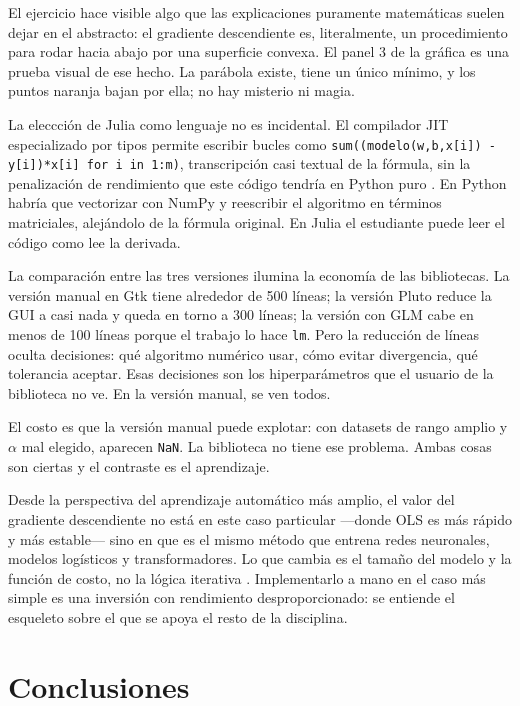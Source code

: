 \documentclass[11pt,a4paper]{article}
\begin{document}
El ejercicio hace visible algo que las explicaciones puramente matem\'aticas suelen dejar en el abstracto: el gradiente descendiente es, literalmente, un procedimiento para rodar hacia abajo por una superficie convexa. El panel 3 de la gr\'afica es una prueba visual de ese hecho. La par\'abola existe, tiene un \'unico m\'inimo, y los puntos naranja bajan por ella; no hay misterio ni magia.

La eleccci\'on de Julia como lenguaje no es incidental. El compilador JIT especializado por tipos permite escribir bucles como \texttt{sum((modelo(w,b,x[i]) - y[i])*x[i] for i in 1:m)}, transcripci\'on casi textual de la f\'ormula, sin la penalizaci\'on de rendimiento que este c\'odigo tendr\'ia en Python puro \cite{bezanson2017julia}. En Python habr\'ia que vectorizar con NumPy y reescribir el algoritmo en t\'erminos matriciales, alej\'andolo de la f\'ormula original. En Julia el estudiante puede leer el c\'odigo como lee la derivada.

La comparaci\'on entre las tres versiones ilumina la econom\'ia de las bibliotecas. La versi\'on manual en Gtk tiene alrededor de 500 l\'ineas; la versi\'on Pluto reduce la GUI a casi nada y queda en torno a 300 l\'ineas; la versi\'on con GLM cabe en menos de 100 l\'ineas porque el trabajo lo hace \texttt{lm}. Pero la reducci\'on de l\'ineas oculta decisiones: qu\'e algoritmo num\'erico usar, c\'omo evitar divergencia, qu\'e tolerancia aceptar. Esas decisiones son los hiperpar\'ametros que el usuario de la biblioteca no ve. En la versi\'on manual, se ven todos.

El costo es que la versi\'on manual puede explotar: con datasets de rango amplio y $\alpha$ mal elegido, aparecen \texttt{NaN}. La biblioteca no tiene ese problema. Ambas cosas son ciertas y el contraste es el aprendizaje.

Desde la perspectiva del aprendizaje autom\'atico m\'as amplio, el valor del gradiente descendiente no est\'a en este caso particular ---donde OLS es m\'as r\'apido y m\'as estable--- sino en que es el mismo m\'etodo que entrena redes neuronales, modelos log\'isticos y transformadores. Lo que cambia es el tama\~no del modelo y la funci\'on de costo, no la l\'ogica iterativa \cite{goodfellow2016deep}. Implementarlo a mano en el caso m\'as simple es una inversi\'on con rendimiento desproporcionado: se entiende el esqueleto sobre el que se apoya el resto de la disciplina.

\section{Conclusiones}
\end{document}
